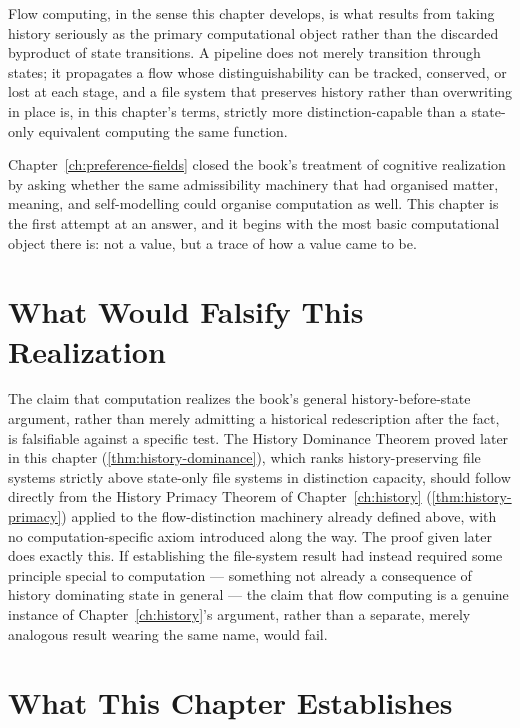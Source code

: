 \documentclass[12pt,twoside,openright]{book}
\begin{document}
Flow computing, in the sense this chapter develops, is what
results from taking history seriously as the primary
computational object rather than the discarded byproduct of
state transitions. A pipeline does not merely transition
through states; it propagates a flow whose distinguishability
can be tracked, conserved, or lost at each stage, and a file
system that preserves history rather than overwriting in
place is, in this chapter's terms, strictly more
distinction-capable than a state-only equivalent computing
the same function.

Chapter~\ref{ch:preference-fields} closed the book's treatment
of cognitive realization by asking whether the same
admissibility machinery that had organised matter, meaning,
and self-modelling could organise computation as well. This
chapter is the first attempt at an answer, and it begins with
the most basic computational object there is: not a value, but
a trace of how a value came to be.

\section{What Would Falsify This Realization}
\label{sec:ch23-falsifiability}

The claim that computation realizes the book's general
history-before-state argument, rather than merely admitting a
historical redescription after the fact, is falsifiable
against a specific test. The History Dominance Theorem proved
later in this chapter (\cref{thm:history-dominance}), which
ranks history-preserving file systems strictly above
state-only file systems in distinction capacity, should follow
directly from the History Primacy Theorem of
Chapter~\ref{ch:history} (\cref{thm:history-primacy}) applied
to the flow-distinction machinery already defined above, with
no computation-specific axiom introduced along the way. The
proof given later does exactly this. If establishing the file-system
result had instead required some principle special to
computation --- something not already a consequence of history
dominating state in general --- the claim that flow computing
is a genuine instance of Chapter~\ref{ch:history}'s argument,
rather than a separate, merely analogous result wearing the
same name, would fail.

\section{What This Chapter Establishes}
\label{sec:ch23-preview}
\end{document}

